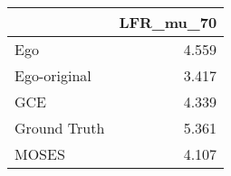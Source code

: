 \begin{tabular}{lr}
\toprule
{} & LFR_mu_70 \\
\midrule
Ego          &     4.559 \\
Ego-original &     3.417 \\
GCE          &     4.339 \\
Ground Truth &     5.361 \\
MOSES        &     4.107 \\
\bottomrule
\end{tabular}
